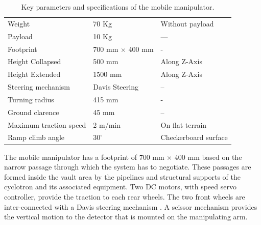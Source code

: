 
%
\begin{table}[!htbp]
	\caption{Key parameters and specifications of the mobile manipulator.}
	\label{tb:specifications}
	\centering
	\begin{tabular}{l l l}
		\hline
		
		Weight  & 70 Kg & Without payload \\ 
		Payload & 10 Kg &---\\
		Footprint & 700 mm $\times$  400 mm & - \\
		Height Collapsed & 500 mm  & Along  Z-Axis\\
		Height Extended & 1500 mm & Along  Z-Axis  \\
		Steering mechanism & Davis Steering & --\\
		Turning radius & 415 mm & - \\
		Ground clarence & 45 mm & --\\
		Maximum traction speed & 2 m/min & On flat terrain \\
		Ramp climb angle & $30^\circ $ & Checkerboard surface\\
		\hline
	\end{tabular}
\end{table}

The mobile manipulator has a footprint of 700 mm $\times$  400 mm  based on the narrow passage through which the system  has to negotiate. These passages are formed inside the vault area by the pipelines and  structural supports of the cyclotron and its associated equipment.  Two DC motors, with speed servo controller,  provide the traction to each rear wheels. The two front wheels are  inter-connected with a Davis steering mechanism \cite{TOMBook}. A scissor mechanism provides the vertical  motion to the detector that is mounted on the manipulating arm.

